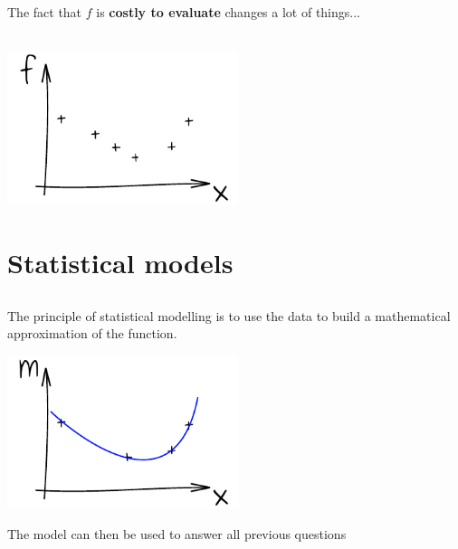 \documentclass{beamer}
\begin{document}
\begin{frame}{}
The fact that $f$ is \textbf{costly to evaluate} changes a lot of things...\\
\vspace{5mm}
\\
\vspace{5mm}
\begin{center}
\includegraphics[height=4.5cm]{figures/ink_fX}
\end{center}
\end{frame}

\section[Statistical models]{Statistical models}
\subsection{}

\begin{frame}{}
The principle of statistical modelling is to use the data to build a mathematical approximation of the function. 
\begin{center}
\includegraphics[height=4.5cm]{figures/ink_m}
\end{center}
The model can then be used to answer all previous questions
\end{frame}
\end{document}
